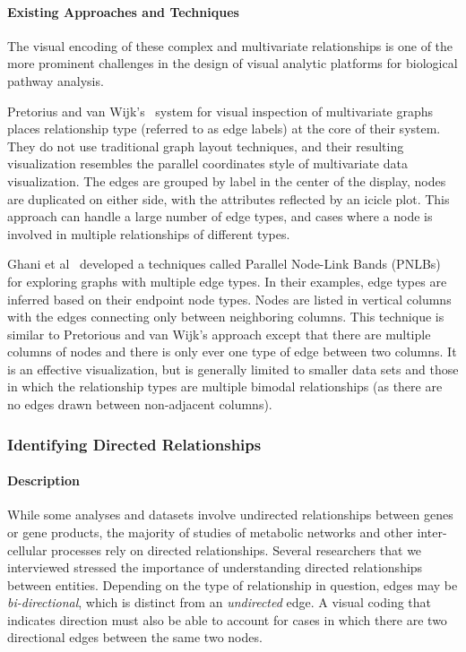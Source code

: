 \documentclass[twocolumn]{bmcart}%
\begin{document}
\paragraph*{Existing Approaches and Techniques}

The visual encoding of these complex and multivariate relationships is one of the more prominent challenges in the design of visual analytic platforms for biological pathway analysis.

Pretorius and van Wijk's~\cite{pretorius2008} system for visual inspection of multivariate graphs places relationship type (referred to as edge labels) at the core of their system.
They do not use traditional graph layout techniques, and their resulting visualization resembles the parallel coordinates style of multivariate data visualization.
The edges are grouped by label in the center of the display, nodes are duplicated on either side, with the attributes reflected by an icicle plot.
This approach can handle a large number of edge types, and cases where a node is involved in multiple relationships of different types.

Ghani et al~\cite{Ghani2013} developed a techniques called Parallel Node-Link Bands (PNLBs) for exploring graphs with multiple edge types.
In their examples, edge types are inferred based on their endpoint node types.
Nodes are listed in vertical columns with the edges connecting only between neighboring columns.
This technique is similar to Pretorious and van Wijk's approach except that there are multiple columns of nodes and there is only ever one type of edge between two columns.
It is an effective visualization, but is generally limited to smaller data sets and those in which the relationship types are multiple bimodal relationships (as there are no edges drawn between non-adjacent columns).

\subsubsection*{Identifying Directed Relationships}

\paragraph*{Description}

While some analyses and datasets involve undirected relationships between genes or gene products, the majority of studies of metabolic networks and other inter-cellular processes rely on directed relationships.
Several researchers that we interviewed stressed the importance of understanding directed relationships between entities.
Depending on the type of relationship in question, edges may be \textit{bi-directional}, which is distinct from an \textit{undirected} edge.
A visual coding that indicates direction must also be able to account for cases in which there are two directional edges between the same two nodes.
\end{document}
